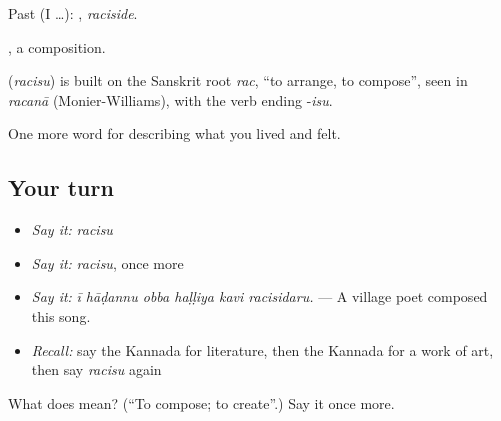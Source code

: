 Past (I …): , \emph{raciside}.

, a composition.

\begin{cousinweb}
\textbf{} (\emph{racisu}) is built on the Sanskrit root \emph{rac}, \textquotedblleft{}to arrange, to compose\textquotedblright{}, seen in \emph{racanā} (Monier-Williams), with the verb ending -\emph{isu}.
\end{cousinweb}

\begin{grammarlens}[title={What you've built}]
One more word for describing what you lived and felt.
\end{grammarlens}

\subsection*{Your turn}
\begin{itemize}
\raggedright
  \item \emph{Say it:} \emph{racisu}
  \item \emph{Say it:} \emph{racisu}, once more
  \item \emph{Say it:} \emph{ī hāḍannu obba haḷḷiya kavi racisidaru.} — A village poet composed this song.
  \item \emph{Recall:} say the Kannada for literature, then the Kannada for a work of art, then say \emph{racisu} again
\end{itemize}

\begin{tcolorbox}[breakable,colback=teal!4,colframe=teal!35!black,title={Before you move on}]
What does  mean? (\textquotedblleft{}To compose; to create\textquotedblright{}.) Say it once more.
\end{tcolorbox}
